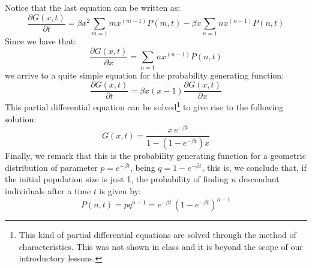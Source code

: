\documentclass{article}
\begin{document}
Notice that the last equation can be written as:
\begin{equation}
\frac{\partial G(x,t)}{\partial t} = \beta x^2 \sum_{m=1} m x^{(m-1)} P(m,t) - \beta x \sum_{n=1}n x^{(n-1)} P(n,t)
\end{equation}
Since we have that:
\begin{equation}
\frac{\partial G(x,t)}{\partial x} = \sum_{n=1} n x^{(n-1)} P(n,t)
\end{equation}
we arrive to a quite simple equation for the probability generating function:
\begin{equation}
\label{eq:GenYule}
\frac{\partial G(x,t)}{\partial t} = \beta x (x-1) \frac{\partial G(x,t)}{\partial x}
\end{equation}
This partial differential equation can be solved\footnote{This kind of partial differential equations are solved through the method of characteristics. This was not shown in class and it is beyond the scope of our introductory lessons.} to give rise to the following solution:
\begin{equation}
G(x,t) = \frac{x \, e^{-\beta t}}{1 - (1 -e^{-\beta t})x}
\end{equation}
Finally, we remark that this is the probability generating function for a geometric distribution of parameter $p=e^{-\beta t}$, being $q=1-e^{-\beta t}$, this is, we conclude that, if the initial population size is just 1, the probability of finding $n$ descendant individuals after a time $t$ is given by:
\begin{equation}
P(n,t) = p q^{n-1} = e^{-\beta t} \, (1 - e^{-\beta t})^{n-1}
\end{equation}
\end{document}
